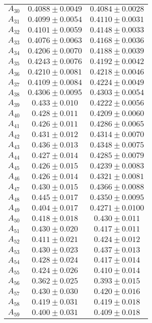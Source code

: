 \begin{tabular}{c|c|c}
$A_30$ & $0.4088\pm0.0049$ & $0.4084\pm0.0028$ \\
$A_31$ & $0.4099\pm0.0054$ & $0.4110\pm0.0031$ \\
$A_32$ & $0.4101\pm0.0059$ & $0.4148\pm0.0033$ \\
$A_33$ & $0.4076\pm0.0063$ & $0.4168\pm0.0036$ \\
$A_34$ & $0.4206\pm0.0070$ & $0.4188\pm0.0039$ \\
$A_35$ & $0.4243\pm0.0076$ & $0.4192\pm0.0042$ \\
$A_36$ & $0.4210\pm0.0081$ & $0.4218\pm0.0046$ \\
$A_37$ & $0.4109\pm0.0084$ & $0.4224\pm0.0049$ \\
$A_38$ & $0.4306\pm0.0095$ & $0.4303\pm0.0054$ \\
$A_39$ & $0.433\pm0.010$ & $0.4222\pm0.0056$ \\
$A_40$ & $0.428\pm0.011$ & $0.4209\pm0.0060$ \\
$A_41$ & $0.426\pm0.011$ & $0.4286\pm0.0065$ \\
$A_42$ & $0.431\pm0.012$ & $0.4314\pm0.0070$ \\
$A_43$ & $0.436\pm0.013$ & $0.4348\pm0.0075$ \\
$A_44$ & $0.427\pm0.014$ & $0.4285\pm0.0079$ \\
$A_45$ & $0.426\pm0.015$ & $0.4239\pm0.0083$ \\
$A_46$ & $0.426\pm0.014$ & $0.4321\pm0.0081$ \\
$A_47$ & $0.430\pm0.015$ & $0.4366\pm0.0088$ \\
$A_48$ & $0.445\pm0.017$ & $0.4350\pm0.0095$ \\
$A_49$ & $0.404\pm0.017$ & $0.4271\pm0.0100$ \\
$A_50$ & $0.418\pm0.018$ & $0.430\pm0.011$ \\
$A_51$ & $0.430\pm0.020$ & $0.417\pm0.011$ \\
$A_52$ & $0.411\pm0.021$ & $0.424\pm0.012$ \\
$A_53$ & $0.430\pm0.023$ & $0.437\pm0.013$ \\
$A_54$ & $0.428\pm0.024$ & $0.417\pm0.014$ \\
$A_55$ & $0.424\pm0.026$ & $0.410\pm0.014$ \\
$A_56$ & $0.362\pm0.025$ & $0.393\pm0.015$ \\
$A_57$ & $0.430\pm0.030$ & $0.420\pm0.016$ \\
$A_58$ & $0.419\pm0.031$ & $0.419\pm0.018$ \\
$A_59$ & $0.400\pm0.031$ & $0.409\pm0.018$ \\

\end{tabular}
